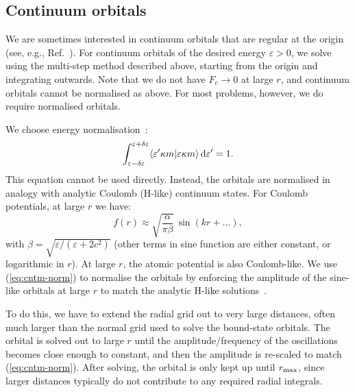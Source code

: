 \documentclass[10pt,twocolumn,a4paper]{article}%
\newcommand{\braket}[1]{\ensuremath{\langle #1\rangle}}	%
\newcommand{\be}{\begin{equation}}
\newcommand{\ee}{\end{equation}}
\def\d{\ensuremath{{\rm d}}}
\def\en{\ensuremath{\varepsilon}}
\renewcommand{\k}{\ensuremath{\kappa}}
\begin{document}
\subsection{Continuum orbitals}

We are sometimes interested in continuum orbitals that are regular at the origin (see, e.g., Ref.~\cite{BetheBook}).
For continuum orbitals of the desired energy $\en>0$, we solve using the multi-step method described above, starting from the origin and integrating outwards.
Note that we do not have $F_c\to0$ at large $r$, and continuum orbitals cannot be normalised as above.
For most problems, however, we do require normalised orbitals.

We choose energy normalisation~\cite{BetheBook}:
\be
\int_{\en-\delta\en}^{\en+\delta\en}\braket{\en' \k m|\en \k m}\,\d\en' = 1.
\ee
This equation cannot be used directly.
Instead, the orbitals are normalised in analogy with analytic Coulomb (H-like) continuum states.
For Coulomb potentials, at large $r$ we have:
\be\label{eq:cntm-norm}
f(r) \approx \sqrt{\frac{\alpha}{\pi \beta}}\,\sin(kr + \ldots),
\ee
with
$
\beta = \sqrt{{\en}/({\en + 2c^2})}
$
(other terms in sine function are either constant, or logarithmic in $r$).
At large $r$, the atomic potential is also Coulomb-like.
We use (\ref{eq:cntm-norm}) to normalise the orbitals by enforcing the amplitude of the sine-like orbitals at large $r$ to match the analytic H-like solutions~\cite{BetheBook}.

To do this, we have to extend the radial grid out to very large distances, often much larger than the normal grid used to solve the bound-state orbitals.
The orbital is solved out to large $r$ until the amplitude/frequency of the oscillations becomes close enough to constant, and then the amplitude is re-scaled to match (\ref{eq:cntm-norm}).
After solving, the orbital is only kept up until $r_{\rm max}$, since larger distances typically do not contribute to any required radial integrals.


\end{document}
